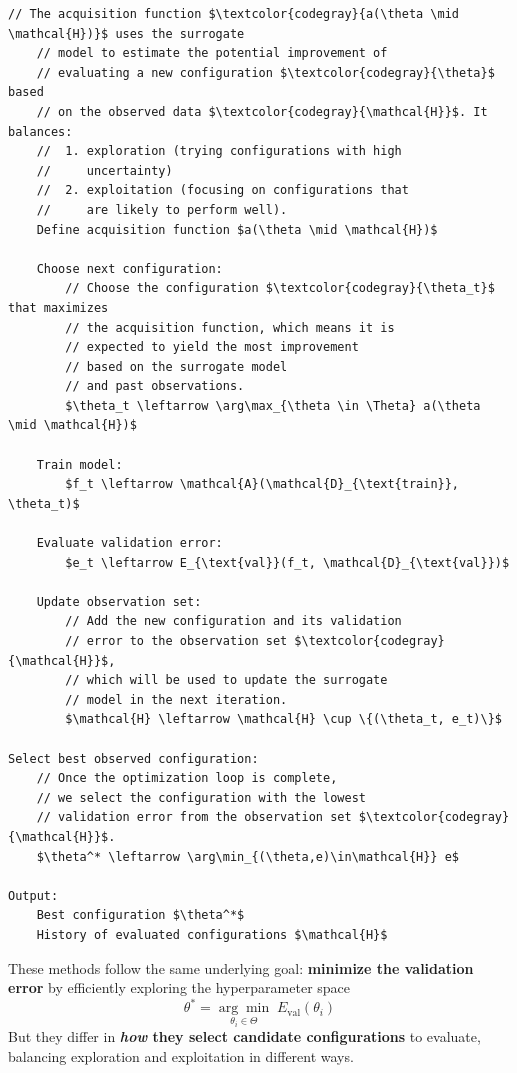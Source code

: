 \begin{enumerate}
\begin{lstlisting}[language=pseudo-code,mathescape=true,style={pseudocode-style},caption={Bayesian Optimization for Hyperparameter Tuning}]
    // The acquisition function $\textcolor{codegray}{a(\theta \mid \mathcal{H})}$ uses the surrogate
    // model to estimate the potential improvement of
    // evaluating a new configuration $\textcolor{codegray}{\theta}$ based
    // on the observed data $\textcolor{codegray}{\mathcal{H}}$. It balances:
    //  1. exploration (trying configurations with high
    //     uncertainty)
    //  2. exploitation (focusing on configurations that
    //     are likely to perform well).
    Define acquisition function $a(\theta \mid \mathcal{H})$

    Choose next configuration:
        // Choose the configuration $\textcolor{codegray}{\theta_t}$ that maximizes
        // the acquisition function, which means it is
        // expected to yield the most improvement
        // based on the surrogate model
        // and past observations.
        $\theta_t \leftarrow \arg\max_{\theta \in \Theta} a(\theta \mid \mathcal{H})$

    Train model:
        $f_t \leftarrow \mathcal{A}(\mathcal{D}_{\text{train}}, \theta_t)$

    Evaluate validation error:
        $e_t \leftarrow E_{\text{val}}(f_t, \mathcal{D}_{\text{val}})$

    Update observation set:
        // Add the new configuration and its validation
        // error to the observation set $\textcolor{codegray}{\mathcal{H}}$,
        // which will be used to update the surrogate
        // model in the next iteration.
        $\mathcal{H} \leftarrow \mathcal{H} \cup \{(\theta_t, e_t)\}$

Select best observed configuration:
    // Once the optimization loop is complete,
    // we select the configuration with the lowest
    // validation error from the observation set $\textcolor{codegray}{\mathcal{H}}$.
    $\theta^* \leftarrow \arg\min_{(\theta,e)\in\mathcal{H}} e$

Output:
    Best configuration $\theta^*$
    History of evaluated configurations $\mathcal{H}$
\end{lstlisting}
\end{enumerate}
These methods follow the same underlying goal: \textbf{minimize the validation error} by efficiently exploring the hyperparameter space
\begin{equation*}
    \theta^{*} = \underset{\theta_{i} \in \Theta}{\arg\min} \; E_{\text{val}}\left(\theta_{i}\right)
\end{equation*}
But they differ in \textbf{\emph{how} they select candidate configurations} to evaluate, balancing exploration and exploitation in different ways.